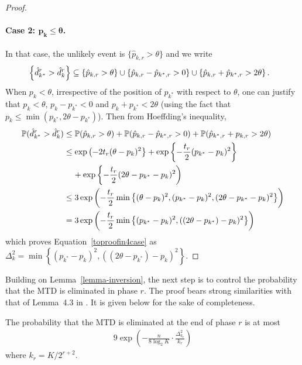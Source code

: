 \begin{proof}
\paragraph{Case 2: $\bm{p_k \leq \theta}$.} In that case, the unlikely event is $\{\hat{p}_{k,r} > \theta\}$ and we write 
\begin{align*}
&\Set{\hat{d}^r_{k^*} > \hat{d}^r_k} \subseteq 
\Set{\hat{p}_{k,r} > \theta} \cup \Set{\hat{p}_{{k},r} - \hat{p}_{k^*,r} > 0}\cup \Set{\hat{p}_{k,r} + \hat{p}_{{k^*},r} > 2\theta}.
\end{align*}
When $p_k < \theta$, irrespective of the position of $p_{k^*}$ with respect to $\theta$, one can justify that $p_k < \theta$, $p_{k} - p_{k^*} < 0$ and ${p}_{k} + {p}_{{k^*}} < 2\theta$ (using the fact that $p_k \leq \min(p_{k^*},2\theta - p_{k^*})$). Then from Hoeffding's inequality,  
\begin{align*}
\mathbb{P}(\hat{d}^r_{k^*} > \hat{d}^r_k) & \leq 
	\mathbb{P}(\hat{p}_{k,r} > \theta)
	+ \mathbb{P}(\hat{p}_{{k},r} - \hat{p}_{k^*,r} > 0)
	+ \mathbb{P}(\hat{p}_{k^*,r} + p_{k,r} > 2\theta)
\\ & \leq 
	\exp\left( -2t_r (\theta - p_k)^2 \right\}
	+ \exp\left\{ - \frac{t_r}{2} (p_{k^*} - p_k)^2 \right\}
\\ & \hspace{0.4cm}
	+ \exp\left\{ - \frac{t_r}{2} (2\theta - p_{k^*} - p_k)^2 \right)
\\ & \leq 
	3 \exp\left( -\frac{t_r}{2} \min\left\{(\theta - p_k)^2,
		(p_{k^*} - p_k)^2,
		(2\theta - p_{k^*} -p_k)^2
	  \right\} \right)
\\ & = 
	3 \exp\left( -\frac{t_r}{2} \min\left\{
		(p_{k^*} - p_{k})^2,
		((2\theta - p_{k^*}) - p_k)^2
	  \right\} \right)
\end{align*}
which proves Equation~\ref{toproofin4case} as $\Delta_k^2 =\min\left\{
		(p_{k^*} - p_{k})^2,
		((2\theta - p_{k^*}) - p_k)^2
	  \right\}$. 
\end{proof}


Building on Lemma~\ref{lemma-inversion}, the next step is to control the probability that the MTD is eliminated in phase $r$. The proof bears strong similarities with that of Lemma~4.3 in \cite{Karnin13}. It is given below for the sake of completeness. 

%
%
\begin{lemma}
\label{lemma-best-survives}
The probability that the MTD is eliminated at the end of phase $r$ is at most
\begin{align*}
9 \exp\left(
	- \frac{n}{8 \log_2 K} \cdot \frac{\Delta^2_{k_r}}{k_r}
\right)	
\end{align*}
where $k_r = K/2^{r + 2}$.
\end{lemma}
%
%

